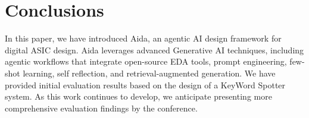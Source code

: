 \section{Conclusions}
\label{sec:conclusions}
In this paper, we have introduced Aida, an agentic AI design framework for digital ASIC design. Aida leverages advanced Generative AI techniques, including agentic workflows that integrate open-source EDA tools, prompt engineering, few-shot learning, self reflection, and retrieval-augmented generation. We have provided initial evaluation results based on the design of a KeyWord Spotter system. As this work continues to develop, we anticipate presenting more comprehensive evaluation findings by the conference.
